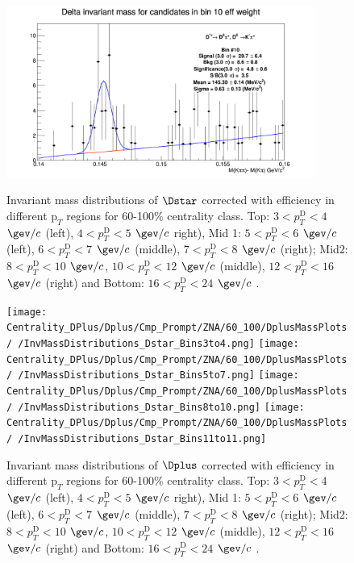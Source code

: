 \begin{figure}[!htp]
{\includegraphics[width=0.6\linewidth, height=5.6cm]{figuresVsCent/Dstar/MassPlots/60100/InvMassDistributions_Dstar_Bins10to10.png}}

\caption{Invariant mass distributions of $\Dstar$ corrected with efficiency in different $\text{p}_T$ regions for 60-100$\%$ centrality class. Top: $3< p_{T}^{\text{D}}< 4$ $\gev/c$ (left), $4< p_{T}^{\text{D}}< 5$ $\gev/c$ right), Mid 1: $5< p_{T}^{\text{D}}< 6$ $\gev/c$ (left), $6 < p_{T}^{\text{D}} < 7$ $\gev/c$ (middle), $7< p_{T}^{\text{D}}< 8$ $\gev/c$ (right); Mid2: $8< p_{T}^{\text{D}}< 10$ $\gev/c$, $10< p_{T}^{\text{D}}< 12$ $\gev/c$  (middle), $12 < p_{T}^{\text{D}}< 16$ $\gev/c$  (right) and Bottom: $16<p_{T}^{\text{D}}< 24$ $\gev/c$ .}
\label{fig:InvMassDs60100}
\end{figure}



\begin{figure}[!htp]
\centering
{\texttt{[image: Centrality\_DPlus/Dplus/Cmp\_Prompt/ZNA/60\_100/DplusMassPlots/
/InvMassDistributions\_Dstar\_Bins3to4.png]}}
{\texttt{[image: Centrality\_DPlus/Dplus/Cmp\_Prompt/ZNA/60\_100/DplusMassPlots/
/InvMassDistributions\_Dstar\_Bins5to7.png]}}
{\texttt{[image: Centrality\_DPlus/Dplus/Cmp\_Prompt/ZNA/60\_100/DplusMassPlots/
/InvMassDistributions\_Dstar\_Bins8to10.png]}}
{\texttt{[image: Centrality\_DPlus/Dplus/Cmp\_Prompt/ZNA/60\_100/DplusMassPlots/
/InvMassDistributions\_Dstar\_Bins11to11.png]}}

\caption{Invariant mass distributions of $\Dplus$ corrected with efficiency in different $\text{p}_T$ regions for 60-100$\%$ centrality class. Top: $3< p_{T}^{\text{D}}< 4$ $\gev/c$ (left), $4< p_{T}^{\text{D}}< 5$ $\gev/c$ right), Mid 1: $5< p_{T}^{\text{D}}< 6$ $\gev/c$ (left), $6 < p_{T}^{\text{D}} < 7$ $\gev/c$ (middle), $7< p_{T}^{\text{D}}< 8$ $\gev/c$ (right); Mid2: $8< p_{T}^{\text{D}}< 10$ $\gev/c$, $10< p_{T}^{\text{D}}< 12$ $\gev/c$  (middle), $12 < p_{T}^{\text{D}}< 16$ $\gev/c$  (right) and Bottom: $16<p_{T}^{\text{D}}< 24$ $\gev/c$ .}
\label{fig:InvMassDplus60100}
\end{figure}



